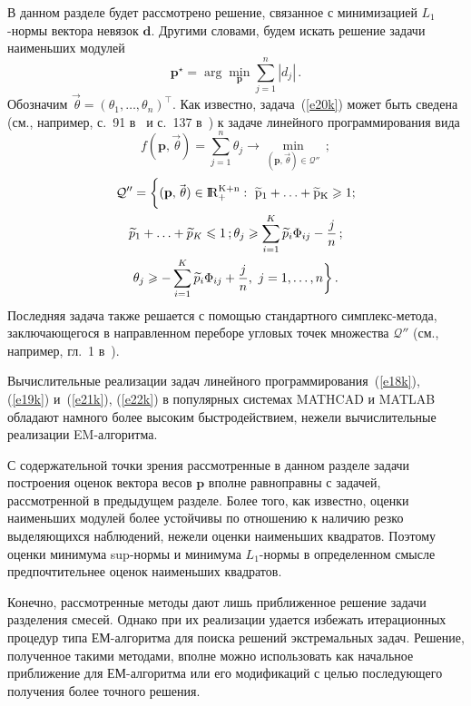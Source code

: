 \begin{multicols}{2}

В данном разделе будет рассмотрено решение, связанное с
минимизацией $L_1$-нормы вектора невязок ${\mathbf d}$. Другими
словами, будем искать решение задачи наименьших модулей
\begin{equation}
{\mathbf p}^{\star}=\arg\min_{\mathbf p}\sum_{j=1}^n|d_j|\,.
\label{e20k}
\end{equation}
Обозначим $\vec{\,\theta}=(\theta_1,\ldots,\theta_n)^{\top}$. Как
известно, задача~(\ref{e20k}) может быть сведена (см., например, с.~91
в~\cite{7k} и с.~137 в~\cite{8k}) к задаче линейного программирования вида
\begin{equation}
f({\mathbf p},\vec{\,\theta})=
\sum_{j=1}^n\theta_j\longrightarrow\min_{({\mathbf
p},{\vec{\,\theta}})\in{\mathcal Q''}}\,;
\label{e21k}
\end{equation}
\begin{multline}
{\mathcal
Q''}=\bigg\{({\mathbf p},{\vec{\,\theta}})\in\rm I\hspace{-0.7mm}\rm R_+^{K+n}:\
\widetilde p_1+\ldots+\widetilde p_K\geqslant1;\\
\widetilde p_1+\ldots+\widetilde p_K \leqslant 1\,;
\theta_j\geqslant\sum_{i=1}^K
\widetilde p_i\Phi_{ij}-\displaystyle\frac{\displaystyle j\mathstrut}{\displaystyle n\mathstrut}\,;\\
\theta_j  \geqslant-\sum_{i=1}^K
\widetilde p_i\Phi_{ij}+\displaystyle\frac{\displaystyle j\mathstrut}{\displaystyle n\mathstrut},\
j=1,\ldots,n\bigg\}\,.\label{e22k}
\end{multline}
Последняя задача также решается с
помощью стандартного симплекс-метода, заключающегося в
направленном переборе угловых точек множества ${\mathcal Q''}$
(см., например, гл.~1 в~\cite{7k}).

Вычислительные реализации задач линейного программирования~(\ref{e18k}),
(\ref{e19k}) и~(\ref{e21k}), (\ref{e22k}) в популярных системах MATHCAD и MATLAB обладают
намного более высоким быстродействием, нежели вычислительные
реализации EM-алгоритма.

С содержательной точки зрения рассмотренные в данном разделе
задачи построения оценок вектора весов $\mathbf p$ вполне
равноправны с задачей, рассмотренной в предыдущем разделе. Более
того, как известно, оценки наименьших модулей более устойчивы по
отношению к наличию резко выделяющихся наблюдений, нежели оценки
наименьших квадратов. Поэтому оценки минимума sup-нормы и минимума
$L_1$-нормы в определенном смысле предпочтительнее оценок
наименьших квадратов.

Конечно, рассмотренные методы дают лишь приближенное решение
задачи разделения смесей. Однако при их реализации удается
избежать итерационных процедур типа ЕМ-алгоритма для поиска
решений экстремальных задач. Решение, полученное такими методами,
вполне можно использовать как начальное приближение для
ЕМ-алгоритма или его модификаций с целью последующего получения
более точного решения.


\end{multicols}
